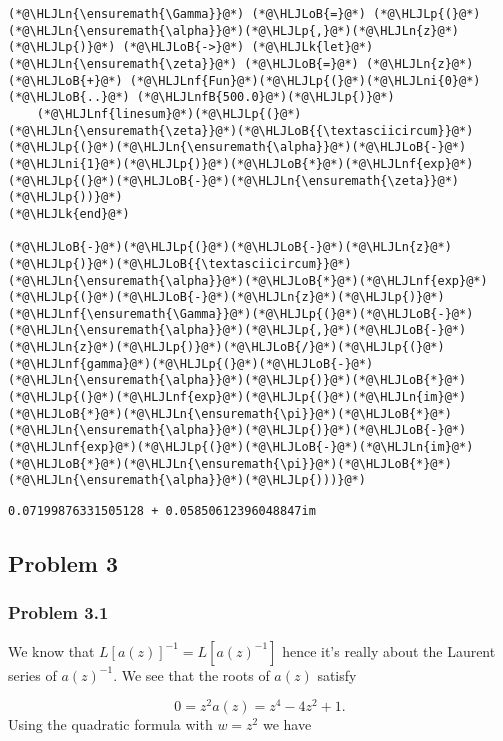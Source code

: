\documentclass[12pt,a4paper]{article}
\newcommand{\HLJLk}[1]{\textcolor[RGB]{148,91,176}{\textbf{#1}}}
\newcommand{\HLJLn}[1]{#1}
\newcommand{\HLJLnf}[1]{\textcolor[RGB]{66,102,213}{#1}}
\newcommand{\HLJLnfB}[1]{\textcolor[RGB]{59,151,46}{#1}}
\newcommand{\HLJLni}[1]{\textcolor[RGB]{59,151,46}{#1}}
\newcommand{\HLJLoB}[1]{\textcolor[RGB]{102,102,102}{\textbf{#1}}}
\newcommand{\HLJLp}[1]{#1}
\begin{document}
\begin{lstlisting}
(*@\HLJLn{\ensuremath{\Gamma}}@*) (*@\HLJLoB{=}@*) (*@\HLJLp{(}@*)(*@\HLJLn{\ensuremath{\alpha}}@*)(*@\HLJLp{,}@*)(*@\HLJLn{z}@*)(*@\HLJLp{)}@*) (*@\HLJLoB{->}@*) (*@\HLJLk{let}@*) (*@\HLJLn{\ensuremath{\zeta}}@*) (*@\HLJLoB{=}@*) (*@\HLJLn{z}@*) (*@\HLJLoB{+}@*) (*@\HLJLnf{Fun}@*)(*@\HLJLp{(}@*)(*@\HLJLni{0}@*) (*@\HLJLoB{..}@*) (*@\HLJLnfB{500.0}@*)(*@\HLJLp{)}@*)
    (*@\HLJLnf{linesum}@*)(*@\HLJLp{(}@*)(*@\HLJLn{\ensuremath{\zeta}}@*)(*@\HLJLoB{{\textasciicircum}}@*)(*@\HLJLp{(}@*)(*@\HLJLn{\ensuremath{\alpha}}@*)(*@\HLJLoB{-}@*)(*@\HLJLni{1}@*)(*@\HLJLp{)}@*)(*@\HLJLoB{*}@*)(*@\HLJLnf{exp}@*)(*@\HLJLp{(}@*)(*@\HLJLoB{-}@*)(*@\HLJLn{\ensuremath{\zeta}}@*)(*@\HLJLp{))}@*)
(*@\HLJLk{end}@*)

(*@\HLJLoB{-}@*)(*@\HLJLp{(}@*)(*@\HLJLoB{-}@*)(*@\HLJLn{z}@*)(*@\HLJLp{)}@*)(*@\HLJLoB{{\textasciicircum}}@*)(*@\HLJLn{\ensuremath{\alpha}}@*)(*@\HLJLoB{*}@*)(*@\HLJLnf{exp}@*)(*@\HLJLp{(}@*)(*@\HLJLoB{-}@*)(*@\HLJLn{z}@*)(*@\HLJLp{)}@*)(*@\HLJLnf{\ensuremath{\Gamma}}@*)(*@\HLJLp{(}@*)(*@\HLJLoB{-}@*)(*@\HLJLn{\ensuremath{\alpha}}@*)(*@\HLJLp{,}@*)(*@\HLJLoB{-}@*)(*@\HLJLn{z}@*)(*@\HLJLp{)}@*)(*@\HLJLoB{/}@*)(*@\HLJLp{(}@*)(*@\HLJLnf{gamma}@*)(*@\HLJLp{(}@*)(*@\HLJLoB{-}@*)(*@\HLJLn{\ensuremath{\alpha}}@*)(*@\HLJLp{)}@*)(*@\HLJLoB{*}@*)(*@\HLJLp{(}@*)(*@\HLJLnf{exp}@*)(*@\HLJLp{(}@*)(*@\HLJLn{im}@*)(*@\HLJLoB{*}@*)(*@\HLJLn{\ensuremath{\pi}}@*)(*@\HLJLoB{*}@*)(*@\HLJLn{\ensuremath{\alpha}}@*)(*@\HLJLp{)}@*)(*@\HLJLoB{-}@*)(*@\HLJLnf{exp}@*)(*@\HLJLp{(}@*)(*@\HLJLoB{-}@*)(*@\HLJLn{im}@*)(*@\HLJLoB{*}@*)(*@\HLJLn{\ensuremath{\pi}}@*)(*@\HLJLoB{*}@*)(*@\HLJLn{\ensuremath{\alpha}}@*)(*@\HLJLp{)))}@*)
\end{lstlisting}

\begin{lstlisting}
0.07199876331505128 + 0.05850612396048847im
\end{lstlisting}


\subsection{Problem 3}
\subsubsection{Problem 3.1}
We know that $L[a(z)]^{-1} = L[a(z)^{-1}]$ hence it's really about the Laurent series of $a(z)^{-1}$. We see that the roots of $a(z)$ satisfy

\[
0 =z^2 a(z) = z^4 - 4z^2 + 1.
\]
Using the quadratic formula with $w = z^2$ we have
\end{document}
